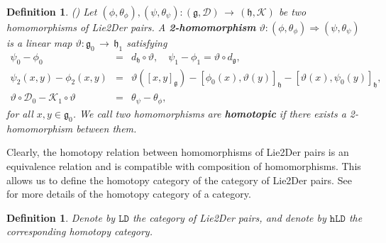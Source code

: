 \documentclass[12pt]{amsart}
\newtheorem{defi}[thm]{Definition}
\newcommand{\lon }{\,\rightarrow\,}
\newcommand{\g}{\mathfrak g}
\newcommand{\h}{\mathfrak h}
\newcommand{\huaD}{\mathcal{D}}
\newcommand{\huaK}{\mathcal{K}}
\newcommand{\LtoD}{{\rm Lie2Der }}
\begin{document}
\begin{defi}{\rm (\cite{LW})}
Let $(\phi,\theta_{\phi}),(\psi,\theta_{\psi}):(\g,\huaD)\lon(\h,\huaK)$ be two homomorphisms of \LtoD pairs. A {\bf 2-homomorphism} $\vartheta:(\phi,\theta_{\phi})\Longrightarrow (\psi,\theta_{\psi})$ is a linear map $\vartheta:\g_0\lon\h_1$ satisfying
\begin{eqnarray}\label{2homo1}
\psi_{0}-\phi_{0}&=&d_{\h}\circ \vartheta,\quad \psi_{1}-\phi_{1}=\vartheta\circ d_{\g},\\
\label{2homo2}
\psi_{2}(x,y)-\phi_{2}(x,y)&=&\vartheta([x,y]_{\g})-[\phi_{0}(x),\vartheta(y)]_{\h}-[\vartheta(x),\psi_{0}(y)]_{\h},\\
\label{eqLie2Der2hom}
\vartheta \circ \huaD_{0}-\huaK_{1}\circ \vartheta&=&\theta_{\psi}-\theta_{\phi},
\end{eqnarray}
for all $x,y\in \g_{0}$. We call two homomorphisms are {\bf homotopic} if there exists a 2-homomorphism between them.
\end{defi}

Clearly, the homotopy relation between homomorphisms of \LtoD pairs is an equivalence relation and is compatible with composition of homomorphisms. This allows us to define the homotopy category of the category of \LtoD pairs. See \cite{May} for more details of the homotopy category of a category.

\begin{defi}
Denote by $\mathtt{LD}$ the category of \LtoD pairs, and denote by $\mathtt{hLD}$ the corresponding homotopy category.
\end{defi}
\end{document}

